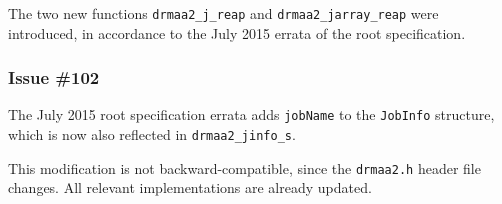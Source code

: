 \documentclass{article}
\newcommand{\h}[1]{\texttt{#1}}
\begin{document}
The two new functions \h{drmaa2\_j\_reap} and \h{drmaa2\_jarray\_reap} were introduced, in accordance to the July 2015 errata of the root specification.

\subsubsection*{Issue \#102}

The July 2015 root specification errata adds \h{jobName} to the \h{JobInfo} structure, which is now also reflected in \h{drmaa2\_jinfo\_s}.

This modification is not backward-compatible, since the \h{drmaa2.h} header file changes. All relevant implementations are already updated.
\end{document}
